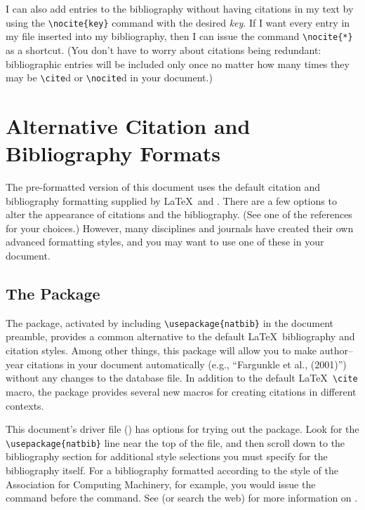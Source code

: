 I can also add entries to the bibliography without having citations in
my text by using the \verb|\nocite{key}| command with the
desired \textit{key}.  If I want every entry in my \BibTeX{} file
inserted into my bibliography, then I can issue the
command \verb|\nocite{*}| as a shortcut.  (You don't have to worry
about citations being redundant: bibliographic entries will be
included only once no matter how many times they may be \verb|\cite|d
or \verb|\nocite|d in your document.)

\section{Alternative Citation and Bibliography Formats}
The pre-formatted version of this document uses the default citation
and bibliography formatting supplied by \LaTeX\ and \BibTeX.  There
are a few options to alter the appearance of citations and the
bibliography.  (See one of the references for your choices.)  However,
many disciplines and journals have created their own
advanced \BibTeX{} formatting styles, and you may want to use one of
these in your document.

\subsection{The  Package}
The  package, activated by
including \verb|\usepackage{natbib}| in the document preamble,
provides a common alternative to the default \LaTeX\ bibliography and
citation styles.  Among other things, this package will allow you to
make author--year citations in your document automatically (e.g.,
``Fargunkle et al., (2001)'') without any changes to the \BibTeX{}
database file.  In addition to the default \LaTeX\ \verb|\cite| macro,
the package provides several new macros for creating citations in
different contexts.

This document's driver file () has options for trying
out the  package.  Look for the \verb|\usepackage{natbib}|
line near the top of the file, and then scroll down to the
bibliography section for additional style selections you must specify
for the bibliography itself.  For a bibliography formatted according
to the style of the Association for Computing Machinery, for example,
you would issue the command \verb|| before
the \verb|| command.  See \cite{Kopka:2004:GLT} (or
search the web) for more information on .

